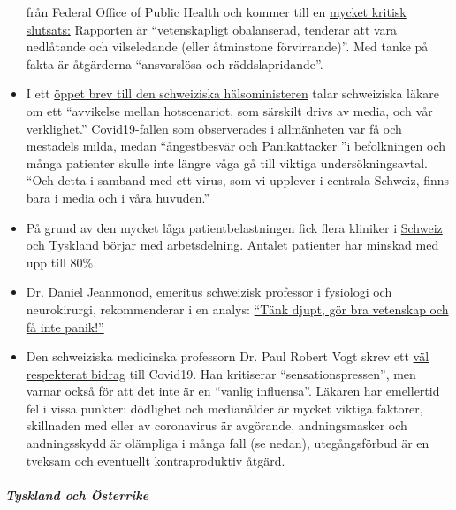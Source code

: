 \begin{itemize}
  från Federal Office of Public Health och kommer till en
  \href{https://covid-19-fakten.blogspot.com/2020/04/die-analyse-des-aktuellen.html}{mycket
  kritisk slutsats:} Rapporten är ``vetenskapligt obalanserad, tenderar
  att vara nedlåtande och vilseledande (eller åtminstone förvirrande)''.
  Med tanke på fakta är åtgärderna ``ansvarslösa och räddslapridande''.
\item
  I ett \href{https://www.rontalpraxis.ch/aktuelles}{öppet brev till den
  schweiziska hälsoministeren} talar schweiziska läkare om ett
  ``avvikelse mellan hotscenariot, som särskilt drivs av media, och vår
  verklighet.'' Covid19-fallen som observerades i allmänheten var få och
  mestadels milda, medan ``ångestbesvär och Panikattacker ''i
  befolkningen och många patienter skulle inte längre våga gå till
  viktiga undersökningsavtal. ``Och detta i samband med ett virus, som
  vi upplever i centrala Schweiz, finns bara i media och i våra
  huvuden.''
\item
  På grund av den mycket låga patientbelastningen fick flera kliniker i
  \href{https://www.20min.ch/schweiz/news/story/Spitaeler-28949526}{Schweiz}
  och
  \href{https://www.spiegel.de/wirtschaft/unternehmen/trotz-corona-pandemie-warum-kliniken-jetzt-kurzarbeit-anmelden-a-3dc61bc9-fb12-4298-8022-bb4c2be39d7d}{Tyskland}
  börjar med arbetsdelning. Antalet patienter har minskad med upp till
  80\%.
\item
  Dr. Daniel Jeanmonod, emeritus schweizisk professor i fysiologi och
  neurokirurgi, rekommenderar i en analys:
  \href{https://off-guardian.org/2020/04/07/think-deep-do-good-science-and-do-not-panic/}{``Tänk
  djupt, gör bra vetenskap och få inte panik!''}
\item
  Den schweiziska medicinska professorn Dr. Paul Robert Vogt skrev ett
  \href{https://www.mittellaendische.ch/2020/04/07/covid-19-eine-zwischenbilanz-oder-eine-analyse-der-moral-der-medizinischen-fakten-sowie-der-aktuellen-und-zuk\%C3\%BCnftigen-politischen-entscheidungen/}{väl
  respekterat bidrag} till Covid19. Han kritiserar
  ``sensationspressen'', men varnar också för att det inte är en
  ``vanlig influensa''. Läkaren har emellertid fel i vissa punkter:
  dödlighet och medianålder är mycket viktiga faktorer, skillnaden med
  eller av coronavirus är avgörande, andningsmasker och andningsskydd är
  olämpliga i många fall (se nedan), utegångsförbud är en tveksam och
  eventuellt kontraproduktiv åtgärd.
\end{itemize}

\hypertarget{tyskland-och-uxf6sterrike}{%
\subparagraph{\texorpdfstring{\textbf{Tyskland och
Österrike}}{Tyskland och Österrike}}\label{tyskland-och-uxf6sterrike}}


